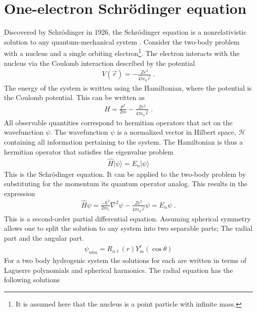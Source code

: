     \section{One-electron Schrödinger equation} \label{sec:Schrodinger_Equation}
        Discovered by Schrödinger in 1926, the Schrödinger equation is a nonrelativistic solution to any quantum-mechanical system \cite{Schrödinger_1926}. Consider the two-body problem with a nucleus and a single orbiting electron\footnote{It is assumed here that the nucleus is a point particle with infinite mass.}. The electron interacts with the nucleus via the Coulomb interaction described by the potential
        \begin{align}
            V(\vec{r}) = -\frac{Z e^2}{4\pi \epsilon_0 \vec{r}}\;.
        \end{align}
        \noindent The energy of the system is written using the Hamiltonian, where the potential is the Coulomb potential. This can be written as
        \begin{align}
            H = \frac{p^2}{2m} -\frac{Z e^2}{4\pi \epsilon_0 \vec{r}}\;.
        \end{align}
        \noindent All observable quantities correspond to hermitian operators that act on the wavefunction $\psi$. The wavefunction $\psi$ is a normalized vector in Hilbert space, $\mathcal{H}$ containing all information pertaining to the system. The Hamiltonian is thus a hermitian operator that satisfies the eigenvalue problem 
        \begin{align}
            \hat{H} \vert\psi \rangle = E_n \vert \psi \rangle
        \end{align}
        \noindent This is the Schrödinger equation. It can be applied to the two-body problem by substituting for the momentum its quantum operator analog. This results in the expression 
        \begin{align}
            \hat{H} \psi  = \frac{-\hbar^2}{2m_e} \nabla^2 \psi -\frac{Z e^2}{4\pi \epsilon_0 \vec{r}} \psi = E_n \psi \;.
        \end{align}
        \noindent This is a second-order partial differential equation. Assuming spherical symmetry allows one to split the solution to any system into two separable parts; The radial part and the angular part.
        \begin{align}
            \psi_{nlm} = R_{n\ell}(r) Y^\ell_m (\cos \theta)
        \end{align}
        \noindent For a two body hydrogenic system the solutions for each are written in terms of Laguerre polynomials and spherical harmonics. The radial equation has the following solutions \cite{Atomic_Physics_Handbook}
